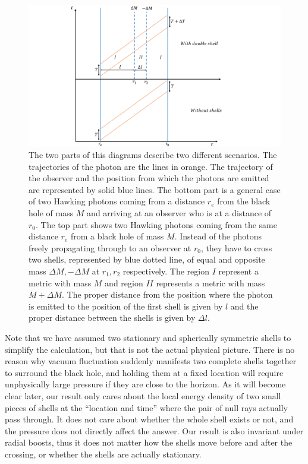 \documentclass[aps,showpacs,onecolumn,floats,prd,superscriptaddress,nofootinbib]{revtex4-1}
\begin{document}
\begin{figure}[tb]
\begin{center}
\includegraphics[scale = 0.6]{Propertime.pdf}
\caption{The two parts of this diagrams describe two different scenarios. The trajectories of the photon are the lines in orange. The trajectory of the observer and the position from which the photons are emitted are represented by solid blue lines. The bottom part is a general case of two Hawking photons coming from a distance $r_e$ from the black hole of mass $M$ and arriving at an observer who is at a distance of $r_0$. The top part shows two Hawking photons coming from the same distance $r_e$ from a black hole of mass $M$. Instead of the photons freely propagating through to an observer at $r_0$, they have to cross two shells, represented by blue dotted line, of equal and opposite mass $\Delta M, -\Delta M$ at $r_{1}, r_{2}$ respectively. The region $I$ represent a metric with mass $M$ and region $II$ represents a metric with mass $M+\Delta M$. The proper distance from the position where the photon is emitted to the position of the first shell is given by $l$ and the proper distance between the shells is given by $\Delta l$. }
\label{fig-setup}
\end{center}
\end{figure}

Note that we have assumed two stationary and spherically symmetric shells to simplify the calculation, but that is not the actual physical picture.
There is no reason why vacuum fluctuation suddenly manifests two complete shells together to surround the black hole, and holding them at a fixed location will require unphysically large pressure if they are close to the horizon.
As it will become clear later, our result only cares about the local energy density of two small pieces of shells at the ``location and time'' where the pair of null rays actually pass through.
It does not care about whether the whole shell exists or not, and the pressure does not directly affect the answer.
Our result is also invariant under radial boosts, thus it does not matter how the shells move before and after the crossing, or whether the shells are actually stationary.
\end{document}
